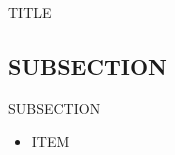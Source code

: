 \documentclass[12pt]{article}
\begin{document}
\begin{center}
TITLE
\end{center}

\subsection{SUBSECTION}
SUBSECTION

\begin{itemize}
\item ITEM
\end{itemize}
\end{document}
